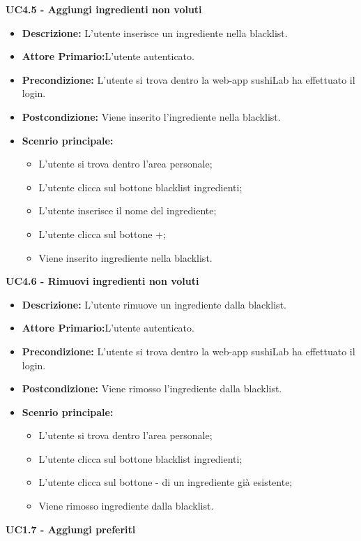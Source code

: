 \textbf{UC4.5 - Aggiungi ingredienti non voluti}
\begin{itemize}
    \item \textbf{Descrizione:} L'utente inserisce un ingrediente nella blacklist.
    \item \textbf{Attore Primario:}L'utente autenticato.
    \item \textbf{Precondizione:} L'utente si trova dentro la web-app sushiLab  ha effettuato il login.
    \item \textbf{Postcondizione:} Viene inserito l'ingrediente nella blacklist.
    \item \textbf{Scenrio principale:}
    \begin{itemize}
        \item L'utente si trova dentro l'area personale;
        \item L'utente clicca sul bottone blacklist ingredienti;
        \item L'utente inserisce il nome del ingrediente;
        \item L'utente clicca sul bottone +;
        \item Viene inserito ingrediente nella blacklist.
    \end{itemize}
\end{itemize}
\textbf{UC4.6 - Rimuovi ingredienti non voluti}
\begin{itemize}
    \item \textbf{Descrizione:} L'utente rimuove un ingrediente dalla blacklist.
    \item \textbf{Attore Primario:}L'utente autenticato.
    \item \textbf{Precondizione:} L'utente si trova dentro la web-app sushiLab  ha effettuato il login.
    \item \textbf{Postcondizione:} Viene rimosso l'ingrediente dalla blacklist.
    \item \textbf{Scenrio principale:}
    \begin{itemize}
        \item L'utente si trova dentro l'area personale;
        \item L'utente clicca sul bottone blacklist ingredienti;
        \item L'utente clicca sul bottone - di un ingrediente già esistente;
        \item Viene rimosso ingrediente dalla blacklist.
    \end{itemize}
\end{itemize}
\textbf{UC1.7 - Aggiungi preferiti}

